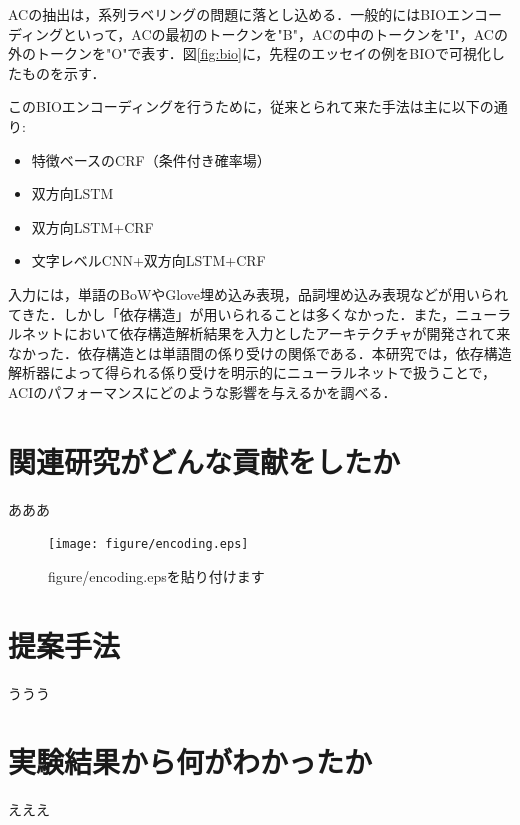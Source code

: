 \documentclass[a4j,fleqn,10pt]{jarticle}
\begin{document}
\par
ACの抽出は，系列ラベリングの問題に落とし込める．一般的にはBIOエンコーディングといって，ACの最初のトークンを"B"，ACの中のトークンを"I"，ACの外のトークンを"O"で表す．図\ref{fig:bio}に，先程のエッセイの例をBIOで可視化したものを示す．

\par
このBIOエンコーディングを行うために，従来とられて来た手法は主に以下の通り:

\begin{itemize}
  \setlength{\parskip}{0cm} %
  \setlength{\itemsep}{0cm} %
  \item 特徴ベースのCRF（条件付き確率場）
  \item 双方向LSTM
  \item 双方向LSTM+CRF
  \item 文字レベルCNN+双方向LSTM+CRF
\end{itemize}

\noindent
入力には，単語のBoWやGlove埋め込み表現，品詞埋め込み表現などが用いられてきた．しかし「依存構造」が用いられることは多くなかった．また，ニューラルネットにおいて依存構造解析結果を入力としたアーキテクチャが開発されて来なかった．依存構造とは単語間の係り受けの関係である．本研究では，依存構造解析器によって得られる係り受けを明示的にニューラルネットで扱うことで，ACIのパフォーマンスにどのような影響を与えるかを調べる．


\section{関連研究がどんな貢献をしたか}
あああ


\begin{figure}[t]
\begin{center}
\texttt{[image: figure/encoding.eps]}
\end{center}
\caption{figure/encoding.epsを貼り付けます}
\label{fig:encoding}
\end{figure}


\section{提案手法}
ううう

\section{実験結果から何がわかったか}
えええ


\footnotesize


\end{document}
